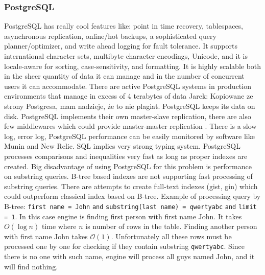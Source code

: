 \documentclass[10pt,a4paper]{article}
\newcommand{\jarek}[1]{\noindent\colorbox{myYellow}{Jarek: #1}}
\newcommand{\Oh}{\mathcal{O}}
\begin{document}
\subsubsection{PostgreSQL}
PostgreSQL has really cool features like: point in time recovery, tablespaces, asynchronous replication, online/hot backups, a sophisticated query planner/optimizer, and write ahead logging for fault tolerance. It supports international character sets, multibyte character encodings, Unicode, and it is locale-aware for sorting, case-sensitivity, and formatting. It is highly scalable both in the sheer quantity of data it can manage and in the number of concurrent users it can accommodate. There are active PostgreSQL systems in production environments that manage in excess of 4 terabytes of data \jarek{Kopiowane ze strony Postgresa, mam nadzieje, że to nie plagiat}.
PostgreSQL keeps its data on disk. PostgreSQL implements their own master-slave replication, there are also few middlewares which could provide master-master replication \cite{PSQLREPL}. There is a slow log, error log, PostgreSQL performance can be easily monitored by software like Munin and New Relic. SQL implies very strong typing system. PostgreSQL processes comparisons and inequalities very fast as long as proper indexes are created. Big disadvantage of using PostgreSQL for this problem is performance on substring queries. B-tree based indexes are not supporting fast processing of substring queries. There are attempts to create full-text indexes (gist, gin) which could outperform classical index based on B-tree.
Example of processing query by B-tree: \verb|first name = John| \verb|and| \verb|substring(last name) = qwertyabc| \verb|and| \verb|limit = 1|. In this case engine is finding first person with first name John. It takes $O(\log n)$ time where $n$ is number of rows in the table. Finding another person with first name John takes $\Oh(1)$. Unfortunately all these rows must be processed one by one for checking if they contain substring \verb|qwertyabc|. Since there is no one with such name, engine will process all guys named John, and it will find nothing.
\end{document}
